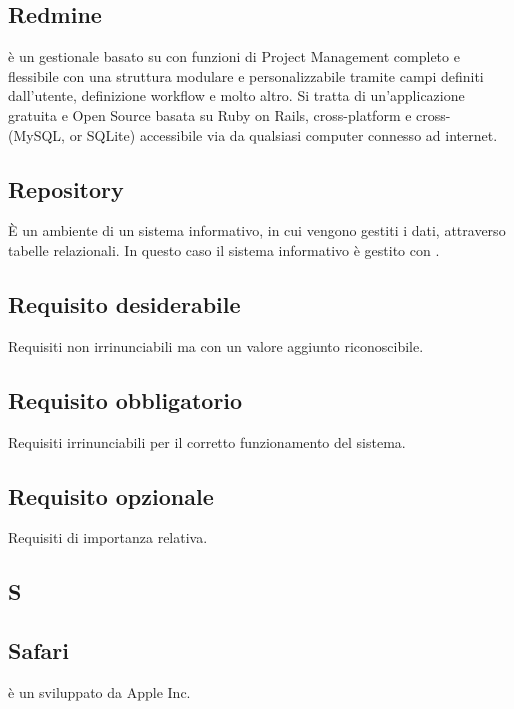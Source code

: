 \subsection{Redmine}
 è un  gestionale basato su  con funzioni di Project Management completo e flessibile con una struttura modulare e personalizzabile tramite campi definiti dall'utente, definizione workflow e molto altro.
Si tratta di un'applicazione gratuita e Open Source basata su  Ruby on Rails, cross-platform e cross- (MySQL,  or SQLite) accessibile via  da qualsiasi computer connesso ad internet.

\subsection{Repository}
È un ambiente di un sistema informativo, in cui vengono gestiti i dati, attraverso
tabelle relazionali. In questo caso il sistema informativo è gestito con .

\subsection{Requisito desiderabile}
Requisiti non irrinunciabili ma con un valore aggiunto riconoscibile.

\subsection{Requisito obbligatorio}
Requisiti irrinunciabili per il corretto funzionamento del sistema.

\subsection{Requisito opzionale}
Requisiti di importanza relativa.

\newpage

\begin{center}
\Huge\section{\uppercase{S}}
\end{center}

\subsection{Safari}
 è un   sviluppato da Apple Inc. 

